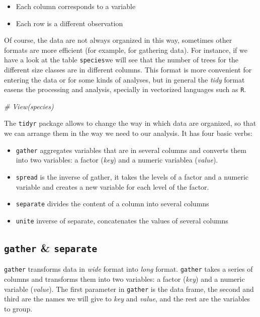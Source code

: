\documentclass[]{article}
\newenvironment{Shaded}{\begin{snugshade}}{\end{snugshade}}
\newcommand{\CommentTok}[1]{\textcolor[rgb]{0.56,0.35,0.01}{\textit{#1}}}
\begin{document}
\begin{itemize}
\item
  Each column corresponds to a variable
\item
  Each row is a different observation
\end{itemize}

Of course, the data are not always organized in this way, sometimes
other formats are more efficient (for example, for gathering data). For
instance, if we have a look at the table \texttt{species}we will see
that the number of trees for the different size classes are in different
columns. This format is more convenient for entering the data or for
some kinds of analyses, but in general the \emph{tidy} format easens the
processing and analysis, specially in vectorized languages such as
\texttt{R}.

\begin{Shaded}
\begin{Highlighting}[]
\CommentTok{# View(species)}
\end{Highlighting}
\end{Shaded}

The \texttt{tidyr} package allows to change the way in which data are
organized, so that we can arrange them in the way we need to our
analysis. It has four basic verbs:

\begin{itemize}
\item
  \texttt{gather} aggregates variables that are in several columns and
  converts them into two variables: a factor (\emph{key}) and a numeric
  variablea (\emph{value}).
\item
  \texttt{spread} is the inverse of gather, it takes the levels of a
  factor and a numeric variable and creates a new variable for each
  level of the factor.
\item
  \texttt{separate} divides the content of a column into several columns
\item
  \texttt{unite} inverse of separate, concatenates the values of several
  columns
\end{itemize}

\subsection{\texorpdfstring{\texttt{gather} \&
\texttt{separate}}{gather \& separate}}\label{gather-separate}

\texttt{gather} transforms data in \emph{wide} format into \emph{long}
format. \texttt{gather} takes a series of columns and transforms them
into two variables: a factor (\emph{key}) and a numeric variable
(\emph{value}). The first parameter in \texttt{gather} is the data
frame, the second and third are the names we will give to \emph{key} and
\emph{value}, and the rest are the variables to group.
\end{document}
